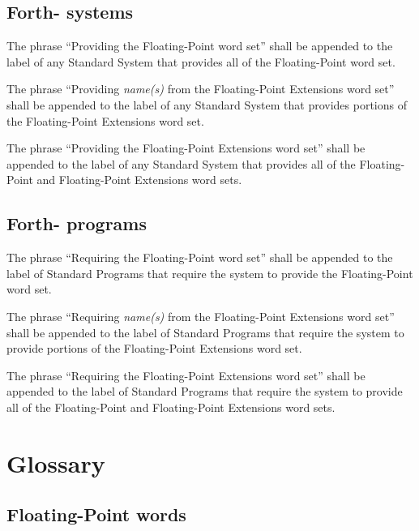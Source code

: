 \subsection{Forth-\snapshot{} systems} %

The phrase ``Providing the Floating-Point word set'' shall be
appended to the label of any Standard System that provides all of
the Floating-Point word set.

The phrase ``Providing \emph{name(s)} from the Floating-Point
Extensions word set'' shall be appended to the label of any Standard
System that provides portions of the Floating-Point Extensions word
set.

The phrase ``Providing the Floating-Point Extensions word set'' shall
be appended to the label of any Standard System that provides all of
the Floating-Point and Floating-Point Extensions word sets.

\subsection{Forth-\snapshot{} programs} %

The phrase ``Requiring the Floating-Point word set'' shall be
appended to the label of Standard Programs that require the system
to provide the Floating-Point word set.

The phrase ``Requiring \emph{name(s)} from the Floating-Point
Extensions word set'' shall be appended to the label of Standard
Programs that require the system to provide portions of the
Floating-Point Extensions word set.

The phrase ``Requiring the Floating-Point Extensions word set'' shall
be appended to the label of Standard Programs that require the system
to provide all of the Floating-Point and Floating-Point Extensions
word sets.

\section{Glossary} %
\vspace{1ex}

\subsection{Floating-Point words} %
\vspace{1ex}

